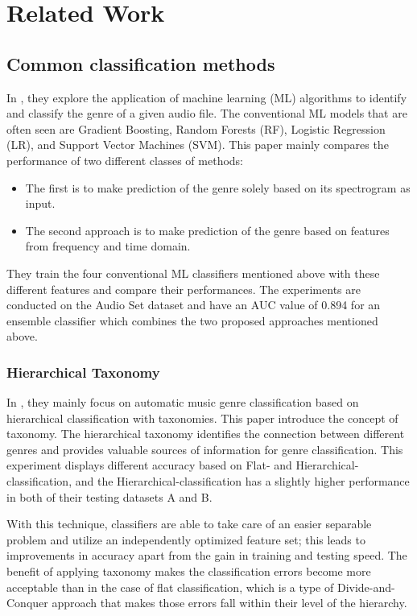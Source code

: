 \section{Related Work}

\subsection{Common classification methods}

In \citet{Bahuleyan2018}, they explore the application of machine learning (ML) algorithms to identify and classify the genre of a given audio file. The conventional ML models that are often seen are Gradient Boosting, Random Forests (RF), Logistic Regression (LR), and Support Vector Machines (SVM). This paper mainly compares the performance of two different classes of methods:
\begin{itemize}
    \item The first is to make prediction of the genre solely based on its spectrogram as input.
    \item The second approach is to make prediction of the genre based on features from frequency and time domain.
\end{itemize}
They train the four conventional ML classifiers mentioned above with these different features and compare their performances. The experiments are conducted on the Audio Set dataset \cite{Gemmeke2017} and have an AUC value of 0.894 for an ensemble classifier which combines the two proposed approaches mentioned above.

\subsubsection{Hierarchical Taxonomy}

In \citet{Li2005}, they mainly focus on automatic music genre classification based on hierarchical classification with taxonomies. This paper introduce the concept of taxonomy. The hierarchical taxonomy identifies the connection between different genres and provides valuable sources of information for genre classification. This experiment displays different accuracy based on Flat- and Hierarchical-classification, and the  Hierarchical-classification has a slightly higher performance in both of their testing datasets A and B.

With this technique, classifiers are able to take care of an easier separable problem and utilize an independently optimized feature set; this leads to improvements in accuracy apart from the gain in training and testing speed. The benefit of applying taxonomy makes the classification errors become more acceptable than in the case of flat classification, which is a type of Divide-and-Conquer approach that makes those errors fall within their level of the hierarchy.

